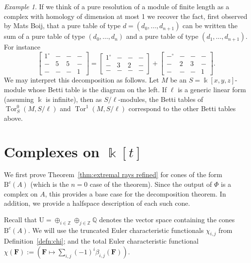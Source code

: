 \documentclass[12pt]{amsart}
\theoremstyle{definition}
\theoremstyle{remark}
\newtheorem{example}[lemma]{Example}
\newcommand{\Tor}{\operatorname{Tor}}
\newcommand{\kk}{\Bbbk}
\newcommand{\ZZ}{\mathbb{Z}}
\newcommand{\QQ}{\mathbb{Q}}
\newcommand{\UU}{\mathrm{U}}
\newcommand{\cc}{c}
\newcommand{\FF}{\mathbf{F}}
\newcommand{\zp}{\circ}
\newcommand{\BBQ}{\mathrm{B}}
\begin{document}
\begin{example}
If we think of a pure resolution of a module of finite length as a complex with homology of dimension at most 1 we recover the fact, first observed by Mats Boij, that a pure table of type $d=(d_0, \dots, d_{n+1})$ can be written the sum of a pure table of type $(d_0, \dots, d_n)$ and a  pure table of type $(d_1, \dots, d_{n+1})$.  For instance
\[
\begin{bmatrix}
1^{\zp}&-&-&-\\
-&5&5&-\\
-&-&-&1
\end{bmatrix}
=
\begin{bmatrix}
1^{\zp}&-&-&-\\
-&3&2&-\\
-&-&-&-
\end{bmatrix}
+
\begin{bmatrix}
-^{\zp}&-&-&-\\
-&2&3&-\\
-&-&-&1
\end{bmatrix}.
\]
We may interpret this decomposition as follows.  Let $M$ be an $S=\kk[x,y,z]$-module whose Betti table is the diagram on the left. If $\ell$ is a generic linear form (assuming $\kk$ is infinite), then as $S/\ell$-modules, the Betti tables of $\Tor^0_S(M,S/\ell)$ and $\Tor^1(M,S/\ell)$ correspond to the other Betti tables above.
\end{example}






\section{Complexes on $\kk[t]$}\label{sec:A}
We first prove Theorem~\ref{thm:extremal rays refined} for cones of the form $\BBQ^{\cc}(A)$ (which is the $n=0$ case of the theorem).
Since the output of $\Phi$ is a complex on $A$, this provides a base case for the decomposition theorem.  In addition, we provide a halfspace description of each such cone.

Recall that $\UU= \oplus_{i\in \ZZ} \oplus_{j\in \ZZ}\QQ$  denotes the vector space containing the cones $\BBQ^{\cc}(A)$. We will use the truncated Euler characteristic functionals $\chi_{i,j}$ from Definition~\ref{defn:chi}; and the total Euler characteristic functional $\chi(\FF):=(\FF\mapsto \sum_{i,j}(-1)^i \beta_{i,j}(\FF))$.  
\end{document}
